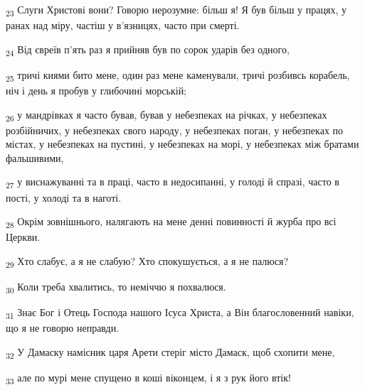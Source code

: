 \begin{tcolorbox}
\textsubscript{23} Слуги Христові вони? Говорю нерозумне: більш я! Я був більш у працях, у ранах над міру, частіш у в'язницях, часто при смерті.
\end{tcolorbox}
\begin{tcolorbox}
\textsubscript{24} Від євреїв п'ять раз я прийняв був по сорок ударів без одного,
\end{tcolorbox}
\begin{tcolorbox}
\textsubscript{25} тричі киями бито мене, один раз мене каменували, тричі розбивсь корабель, ніч і день я пробув у глибочині морській;
\end{tcolorbox}
\begin{tcolorbox}
\textsubscript{26} у мандрівках я часто бував, бував у небезпеках на річках, у небезпеках розбійничих, у небезпеках свого народу, у небезпеках поган, у небезпеках по містах, у небезпеках на пустині, у небезпеках на морі, у небезпеках між братами фальшивими,
\end{tcolorbox}
\begin{tcolorbox}
\textsubscript{27} у виснажуванні та в праці, часто в недосипанні, у голоді й спразі, часто в пості, у холоді та в наготі.
\end{tcolorbox}
\begin{tcolorbox}
\textsubscript{28} Окрім зовнішнього, налягають на мене денні повинності й журба про всі Церкви.
\end{tcolorbox}
\begin{tcolorbox}
\textsubscript{29} Хто слабує, а я не слабую? Хто спокушується, а я не палюся?
\end{tcolorbox}
\begin{tcolorbox}
\textsubscript{30} Коли треба хвалитись, то неміччю я похвалюся.
\end{tcolorbox}
\begin{tcolorbox}
\textsubscript{31} Знає Бог і Отець Господа нашого Ісуса Христа, а Він благословенний навіки, що я не говорю неправди.
\end{tcolorbox}
\begin{tcolorbox}
\textsubscript{32} У Дамаску намісник царя Арети стеріг місто Дамаск, щоб схопити мене,
\end{tcolorbox}
\begin{tcolorbox}
\textsubscript{33} але по мурі мене спущено в коші віконцем, і я з рук його втік!
\end{tcolorbox}

